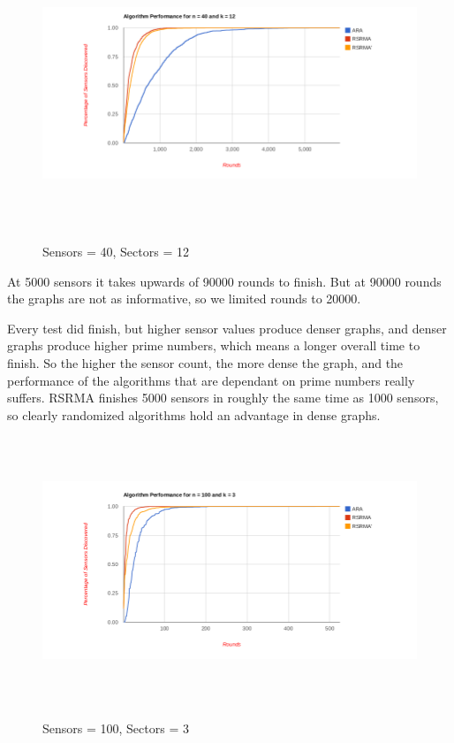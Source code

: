 \begin{figure}[ht]
\caption{Sensors = 40, Sectors = 12}
\includegraphics[height = 8cm]{pics/graph40k12.png}\\[0.5cm] 
\label{fig:n40k12}   
\end{figure}

At 5000 sensors it takes upwards of 90000 rounds to finish. But at 90000 rounds the graphs are not as informative, so we limited rounds to 20000. 

Every test did finish, but higher sensor values produce denser graphs, and denser graphs produce higher prime numbers, which means a longer overall time to finish. So the higher the sensor count, the more dense the graph, and the performance of the algorithms that are dependant on prime numbers really suffers. RSRMA finishes 5000 sensors in roughly the same time as 1000 sensors, so clearly randomized algorithms hold an advantage in dense graphs.


\begin{figure}[ht]
\caption{Sensors = 100, Sectors = 3}
\includegraphics[height = 8cm]{pics/graph100k3.png}\\[0.5cm]    
\label{fig:n10k3}
\end{figure}

